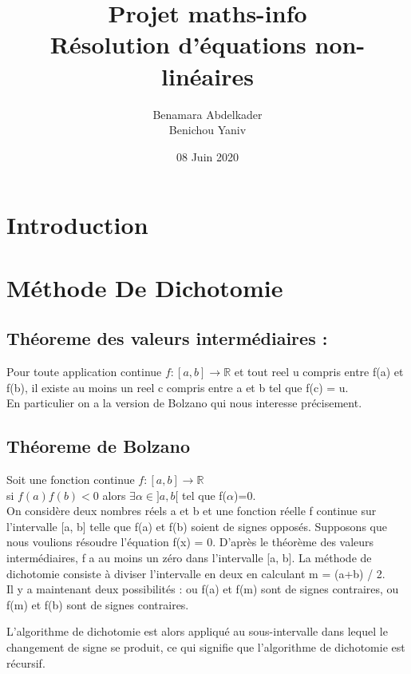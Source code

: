\documentclass{article}
\author{Benamara Abdelkader \\ Benichou Yaniv }
\date{08 Juin 2020}
\newcommand{\R}{\mathbb{R}}
\begin{document}
\title{Projet maths-info \\ 
Résolution d'équations non-linéaires}
\maketitle

\newpage
\tableofcontents
\newpage

\section{Introduction}

\newpage


\section{Méthode De Dichotomie}
\subsection{Théoreme des valeurs intermédiaires :}
Pour toute application continue $ f : [a, b] \to \R $ et tout reel u compris entre f(a) et f(b), il existe au moins un reel c compris entre a et b tel que f(c) = u. \\
En particulier on a la version de Bolzano qui nous interesse précisement.

\subsection{Théoreme de Bolzano}
Soit une fonction continue $ f : [a, b] \to \R $ \\
si $ f(a)f(b) < 0 $  alors $ \exists \alpha \in  ]a, b[ $ tel que f($\alpha$)=0. \\ 


On considère deux nombres réels a et b et une fonction réelle f continue sur l'intervalle [a, b] telle que f(a) et f(b) soient de signes opposés. Supposons que nous voulions résoudre l'équation f(x) = 0. D'après le théorème des valeurs intermédiaires, f a au moins un zéro dans l’intervalle [a, b]. La méthode de dichotomie consiste à diviser l’intervalle en deux en calculant m = (a+b) / 2. \\
Il y a maintenant deux possibilités : ou f(a) et f(m) sont de signes contraires, ou f(m) et f(b) sont de signes contraires.

L’algorithme de dichotomie est alors appliqué au sous-intervalle dans lequel le changement de signe se produit, ce qui signifie que l’algorithme de dichotomie est récursif.
\end{document}
